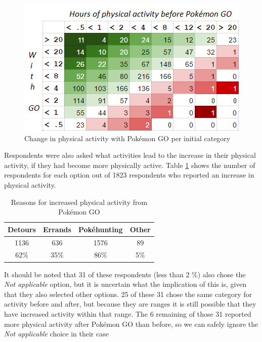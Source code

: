 \begin{figure}[h]
	\centering
	\includegraphics{Figures/change-in-physical-activity-table-colors}
	\caption{Change in physical activity with Pokémon GO per initial category}
	\label{fig:change-in-physical-activity}
\end{figure}

Respondents were also asked what activities lead to the increase in their physical activity, if they had become more physically active. Table \ref{tbl:physical-activity-sources} shows the number of respondents for each option out of 1823 respondents who reported an increase in physical activity.

\begin{table}[h]
	\centering
	\caption{Reasons for increased physical activity from Pokémon GO}
	\label{tbl:physical-activity-sources}
	\begin{tabular}{|c|c|c|c|}
		\hline
		\textbf{Detours} & \textbf{Errands} & \textbf{Pokéhunting} & \textbf{Other}\\\hline\hline
		1136 & 636 & 1576 & 89\\
		62\% & 35\% & 86\% & 5\%\\\hline
	\end{tabular}
\end{table}

It should be noted that 31 of these respondents (less than 2 \%) also chose the \emph{Not applicable} option, but it is uncertain what the implication of this is, given that they also selected other options. 25 of these 31 chose the same category for activity before and after, but because they are ranges it is still possible that they have increased activity within that range. The 6 remaining of those 31 reported more physical activity after Pokémon GO than before, so we can safely ignore the \emph{Not applicable} choice in their case

